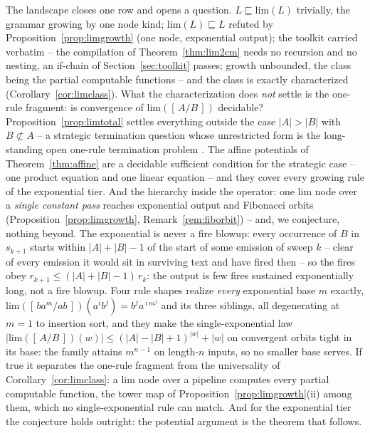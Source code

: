 \documentclass[runningheads,envcountsect]{llncs}
\begin{document}
The landscape closes one row and opens a question. $L \sqsubseteq \mathrm{lim}(L)$ trivially, the grammar growing
by one node kind; $\mathrm{lim}(L) \sqsubseteq L$ refuted by
Proposition~\ref{prop:limgrowth} (one node, exponential output); the
toolkit carried verbatim -- the compilation of
Theorem~\ref{thm:lim2cm} needs no recursion and no nesting, an if-chain
of Section~\ref{sec:toolkit} passes; growth unbounded, the class being
the partial computable functions -- and the class is exactly
characterized (Corollary~\ref{cor:limclass}). What the characterization
does \emph{not}
settle is the one-rule fragment: is convergence of
$\mathrm{lim}([\,A/B\,])$ decidable? Proposition~\ref{prop:limtotal}
settles everything outside the case $|A| > |B|$ with
$B \not\subset A$ -- a strategic termination question whose
unrestricted form is the long-standing open one-rule termination
problem \cite{geser01}.  The affine potentials of
Theorem~\ref{thm:affine} are a decidable sufficient condition for the
strategic case -- one product equation and one linear equation -- and
they cover every growing rule of the exponential tier. And the hierarchy inside the
operator: one $\mathrm{lim}$ node over a \emph{single constant pass}
reaches exponential output and Fibonacci orbits
(Proposition~\ref{prop:limgrowth}, Remark~\ref{rem:fiborbit}) -- and, we
conjecture, nothing beyond. The exponential is never a fire blowup:
every occurrence of $B$ in $s_{k+1}$ starts within $|A|{+}|B|{-}1$ of
the start of some emission of sweep $k$ -- clear of every emission it
would sit in surviving text and have fired then -- so the fires obey
$r_{k+1} \le (|A|{+}|B|{-}1)\,r_{k}$: the output
is few fires sustained exponentially long, not a fire blowup. Four rule shapes realize
\emph{every} exponential base $m$ exactly,
$\mathrm{lim}([\,ba^{m}/ab\,])(a^{i}b^{j}) = b^{j}a^{\,i\,m^{j}}$ and
its three siblings, all degenerating at $m = 1$ to insertion sort,
and they make the single-exponential law
$|\mathrm{lim}([\,A/B\,])(w)| \le (|A|{-}|B|{+}1)^{|w|} + |w|$ on
convergent orbits tight in its base: the family attains $m^{n-1}$ on
length-$n$ inputs, so no smaller base serves. If true it separates the
one-rule fragment from the universality of Corollary~\ref{cor:limclass}:
a $\mathrm{lim}$ node over a pipeline computes every partial computable
function, the tower map of Proposition~\ref{prop:limgrowth}(ii) among
them, which no single-exponential rule can match. And for the
exponential tier the conjecture holds outright: the potential
argument is the theorem that follows.
\end{document}
